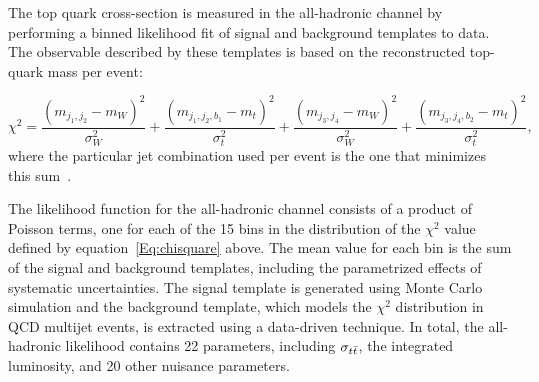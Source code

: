 The top quark cross-section is measured in the all-hadronic channel by performing a binned likelihood fit of signal and background templates to data.
The observable described by these templates is based on the reconstructed top-quark mass per event:

\begin{equation}\label{Eq:chisquare}
  \chi^2 =  \frac{ \left(m_{j_1, j_2} - m_{W}\right)^2}{\sigma_W^2} + \frac{ \left(m_{j_1, j_2, b_1} - m_{t}\right)^2}{\sigma_t^2} + \frac{ \left(m_{j_3, j_4} - m_{W}\right)^2}{\sigma_W^2} + \frac{ \left(m_{j_3, j_4, b_2} - m_{t}\right)^2}{\sigma_t^2},
  \end{equation}
where the particular jet combination used per event is the one that minimizes this sum~\cite{ATLAS-CONF-2011-140}.

The likelihood function for the all-hadronic channel consists of a product of Poisson terms, 
one for each of the 15 bins in the distribution of the $\chi^2$ value defined by equation~\ref{Eq:chisquare} above. 
The mean value for each bin is the sum of the signal and background templates, including the parametrized effects of systematic uncertainties.
The signal template is generated using Monte Carlo simulation and the background template, which models the $\chi^2$ distribution in QCD multijet events, is extracted using a data-driven technique.
In total, the all-hadronic likelihood contains 22 parameters, including $\sigma_{t\bar{t}}$, the integrated luminosity, and 20 other nuisance parameters.

